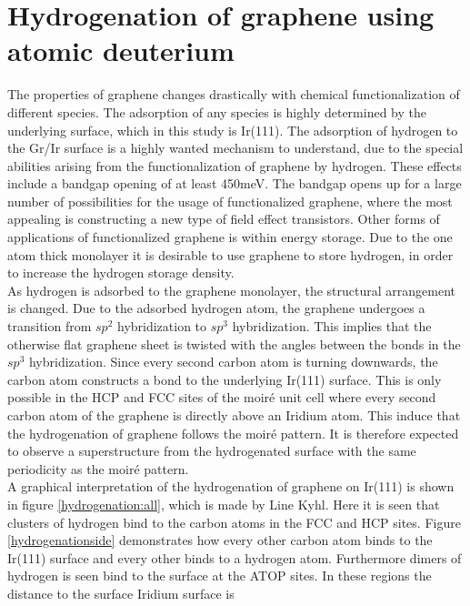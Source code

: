 \section{Hydrogenation of graphene using atomic deuterium}

The properties of graphene changes drastically with chemical functionalization of different species. The adsorption of any species is highly determined by the underlying surface, which in this study is Ir(111). The adsorption of hydrogen to the Gr/Ir surface is a highly wanted mechanism to understand, due to the special abilities arising from the functionalization of graphene by hydrogen. These effects include a bandgap opening of at least 450meV.\cite{e40134a5a1aa4cb69ba806c02cd8e327} The bandgap opens up for a large number of possibilities for the usage of functionalized graphene, where the most appealing is constructing a new type of field effect transistors. Other forms of applications of functionalized graphene is within energy storage. Due to the one atom thick monolayer it is desirable to use graphene to store hydrogen, in order to increase the hydrogen storage density.\\
As hydrogen is adsorbed to the graphene monolayer, the structural arrangement is changed. Due to the adsorbed hydrogen atom, the graphene undergoes a transition from $sp^2$ hybridization to $sp^3$ hybridization. This implies that the otherwise flat graphene sheet is twisted with the angles between the bonds in the $sp^3$ hybridization. Since every second carbon atom is turning downwards, the carbon atom constructs a bond to the underlying Ir(111) surface. This is only possible in the HCP and FCC sites of the moiré unit cell where every second carbon atom of the graphene is directly above an Iridium atom. This induce that the hydrogenation of graphene follows the moiré pattern.\cite{PhysRevB.93.115403} It is therefore expected to observe a superstructure from the hydrogenated surface with the same periodicity as the moiré pattern.\\
A graphical interpretation of the hydrogenation of graphene on Ir(111) is shown in figure \ref{hydrogenation:all}, which is made by Line Kyhl. Here it is seen that clusters of hydrogen bind to the carbon atoms in the FCC and HCP sites. Figure \ref{hydrogenationside} demonstrates how every other carbon atom binds to the Ir(111) surface and every other binds to a hydrogen atom. Furthermore dimers of hydrogen is seen bind to the surface at the ATOP sites. In these regions the distance to the surface Iridium surface is

